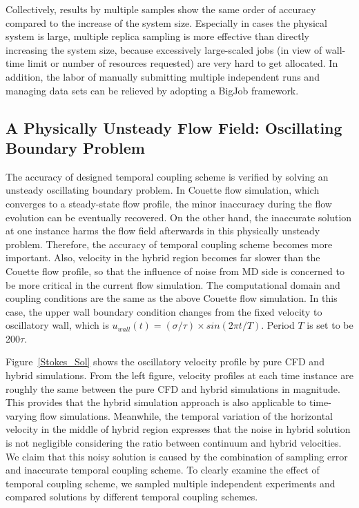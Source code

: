 \documentclass[preprint,12pt]{elsarticle}
\begin{document}
Collectively, results by multiple samples show the same order of accuracy 
compared to the increase of the system size. Especially in cases the physical system is large, 
multiple replica sampling is more effective than directly increasing the system size, 
because excessively large-scaled jobs (in view of wall-time limit or 
number of resources requested) are very hard to get allocated. In addition, 
the labor of manually submitting multiple independent runs and 
managing data sets can be relieved by adopting a BigJob framework.


\subsection{A Physically Unsteady Flow Field: Oscillating Boundary Problem}
\label{sec:accuracy_oscillation}

The accuracy of designed temporal coupling scheme is verified by solving an unsteady oscillating boundary problem. In Couette flow simulation, which converges to a steady-state flow profile, the minor inaccuracy during the flow evolution can be eventually recovered. On the other hand, the inaccurate solution at one instance harms the flow field afterwards in this physically unsteady problem. Therefore, the accuracy of temporal coupling scheme becomes more important. Also, velocity in the hybrid region becomes far slower than the Couette flow profile, so that the influence of noise from MD side is concerned to be more critical in the current flow simulation. The computational domain and coupling conditions are the same as the above Couette flow simulation. In this case, the upper wall boundary condition changes from the fixed velocity to oscillatory wall, which is $u_{wall}(t)=({\sigma}/{\tau}){\times}sin(2{\pi}t/T)$. Period $T$ is set to be 200$\tau$.


Figure~\ref{Stokes_Sol} shows the oscillatory velocity profile by pure CFD and hybrid simulations. From the left figure, velocity profiles at each time instance are roughly the same between the pure CFD and hybrid simulations in magnitude. This provides that the hybrid simulation approach is also applicable to time-varying flow simulations. Meanwhile, the temporal variation of the horizontal velocity in the middle of hybrid region expresses that the noise in hybrid solution is not negligible considering the ratio between continuum and hybrid velocities. We claim that this noisy solution is caused by the combination of sampling error and inaccurate temporal coupling scheme. To clearly examine the effect of temporal coupling scheme, we sampled multiple independent experiments and compared solutions by different temporal coupling schemes.
\end{document}
